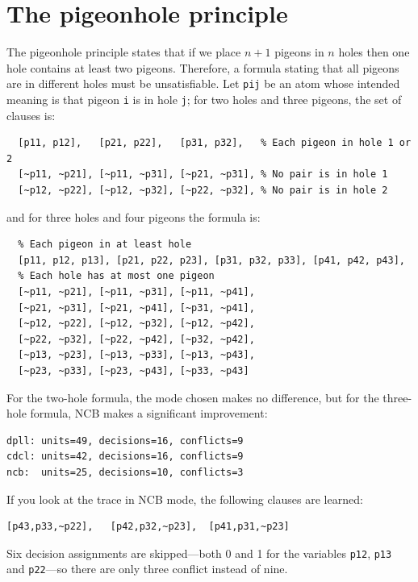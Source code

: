 \documentclass[11pt]{report}
\newcommand*{\p}[1]{\textup{\texttt{#1}}}
\begin{document}
\clearpage

\chapter{The pigeonhole principle}\label{ch.pigeon}

The pigeonhole principle states that if we place $n+1$ pigeons in $n$
holes then one hole contains at least two pigeons. Therefore, a formula
stating that all pigeons are in different holes must be unsatisfiable.
Let \p{pij} be an atom whose intended meaning is that pigeon \p{i} is in
hole \p{j}; for two holes and three pigeons, the set of clauses is:

\begin{verbatim}
  [p11, p12],   [p21, p22],   [p31, p32],   % Each pigeon in hole 1 or 2 
  [~p11, ~p21], [~p11, ~p31], [~p21, ~p31], % No pair is in hole 1
  [~p12, ~p22], [~p12, ~p32], [~p22, ~p32], % No pair is in hole 2
\end{verbatim}

and for three holes and four pigeons the formula is:

\begin{verbatim}
  % Each pigeon in at least hole
  [p11, p12, p13], [p21, p22, p23], [p31, p32, p33], [p41, p42, p43], 
  % Each hole has at most one pigeon
  [~p11, ~p21], [~p11, ~p31], [~p11, ~p41],
  [~p21, ~p31], [~p21, ~p41], [~p31, ~p41],
  [~p12, ~p22], [~p12, ~p32], [~p12, ~p42],
  [~p22, ~p32], [~p22, ~p42], [~p32, ~p42],
  [~p13, ~p23], [~p13, ~p33], [~p13, ~p43],
  [~p23, ~p33], [~p23, ~p43], [~p33, ~p43]
\end{verbatim}

For the two-hole formula, the mode chosen makes no difference, but for
the three-hole formula, NCB makes a significant improvement:

\begin{verbatim}
dpll: units=49, decisions=16, conflicts=9
cdcl: units=42, decisions=16, conflicts=9
ncb:  units=25, decisions=10, conflicts=3
\end{verbatim}

If you look at the trace in NCB mode, the following clauses are
learned:

\begin{verbatim}
[p43,p33,~p22],   [p42,p32,~p23],  [p41,p31,~p23]
\end{verbatim}

Six decision assignments are skipped---both 0 and 1 for the variables
\p{p12}, \p{p13} and \p{p22}---so there are only three conflict instead
of nine.
\end{document}
